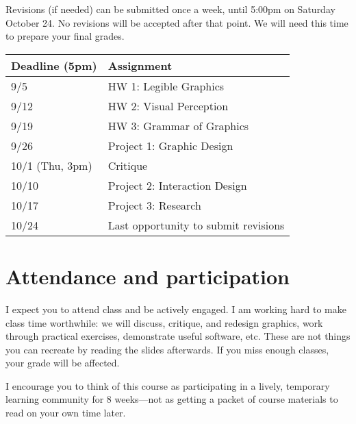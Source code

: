 \documentclass[12pt]{article}
\begin{document}
Revisions (if needed) can be submitted once a week, until 5:00pm on Saturday October 24. No revisions will be accepted after that point. We will need this time to prepare your final grades.

\begin{table}[h!]
\begin{tabular}{p{1.5in}p{2.75in}}
\textbf{Deadline (5pm)} & \textbf{Assignment} \\ \hline
9/5 & HW 1: Legible Graphics\\
9/12 & HW 2: Visual Perception\\
9/19 & HW 3: Grammar of Graphics\\
9/26 & Project 1: Graphic Design\\
10/1 (Thu, 3pm) & Critique\\
10/10 & Project 2: Interaction Design\\
10/17 & Project 3: Research\\
10/24 & Last opportunity to submit revisions
\end{tabular}
\end{table}

\section*{Attendance and participation}
I expect you to attend class and be actively engaged. I am working hard to make class time worthwhile: we will discuss, critique, and redesign graphics, work through practical exercises, demonstrate useful software, etc. These are not things you can recreate by reading the slides afterwards.
If you miss enough classes, your grade will be affected.

I encourage you to think of this course as participating in a lively, temporary learning community for 8 weeks---not as getting a packet of course materials to read on your own time later.
\end{document}
